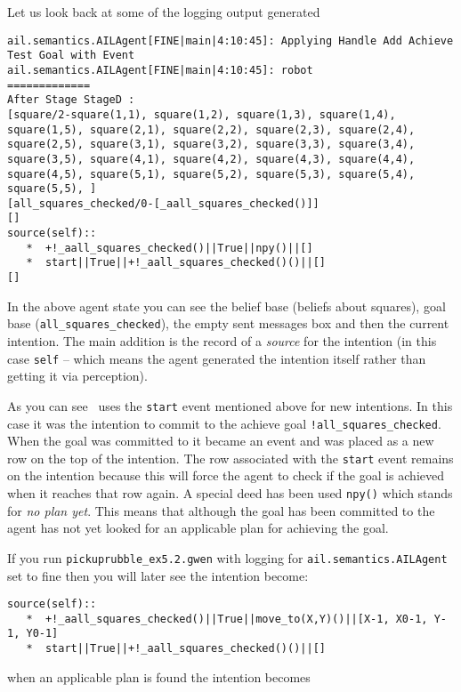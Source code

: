 Let us look back at some of the logging output generated 

\begin{verbatim}
ail.semantics.AILAgent[FINE|main|4:10:45]: Applying Handle Add Achieve Test Goal with Event 
ail.semantics.AILAgent[FINE|main|4:10:45]: robot
=============
After Stage StageD :
[square/2-square(1,1), square(1,2), square(1,3), square(1,4), square(1,5), square(2,1), square(2,2), square(2,3), square(2,4), square(2,5), square(3,1), square(3,2), square(3,3), square(3,4), square(3,5), square(4,1), square(4,2), square(4,3), square(4,4), square(4,5), square(5,1), square(5,2), square(5,3), square(5,4), square(5,5), ]
[all_squares_checked/0-[_aall_squares_checked()]]
[]
source(self):: 
   *  +!_aall_squares_checked()||True||npy()||[]
   *  start||True||+!_aall_squares_checked()()||[]
[] 
\end{verbatim}
In the above agent state you can see the belief base (beliefs about squares), goal base (\texttt{all\_squares\_checked}), the empty sent messages box and then the current intention.  The main addition is the record of a \emph{source} for the intention (in this case \texttt{self} -- which means the agent generated the intention itself rather than getting it via perception).

As you can see \gwendolen\ uses the \texttt{start} event mentioned above for new intentions.  In this case it was the intention to commit to the achieve goal \lstinline{!all_squares_checked}.  When the goal was committed to it became an event and was placed as a new row on the top of the intention.  The row associated with the \texttt{start} event remains on the intention because this will force the agent to check if the goal is achieved when it reaches that row again.  A special deed has been used \texttt{npy()} which stands for \emph{no plan yet}.  This means that although the goal has been committed to the agent has not yet looked for an applicable plan for achieving the goal.

\begin{sloppypar}
If you run \texttt{pickuprubble\_ex5.2.gwen} with logging for \texttt{ail.semantics.AILAgent} set to fine then you will later see the intention become:
\end{sloppypar}
\begin{verbatim}
source(self):: 
   *  +!_aall_squares_checked()||True||move_to(X,Y)()||[X-1, X0-1, Y-1, Y0-1]
   *  start||True||+!_aall_squares_checked()()||[]
\end{verbatim}
when an applicable plan is found the intention becomes

